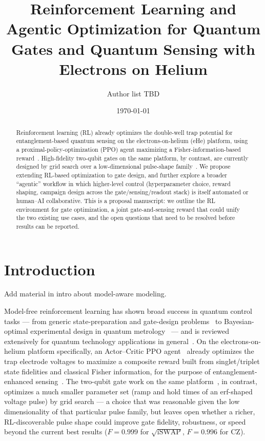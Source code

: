 \documentclass[aps,prapplied,reprint,superscriptaddress,longbibliography]{revtex4-2}
\begin{document}
\title{Reinforcement Learning and Agentic Optimization for Quantum Gates and Quantum Sensing with
Electrons on Helium}

\author{Author list TBD}

\date{\today}

\begin{abstract}
Reinforcement learning (RL) already optimizes the double-well trap potential for entanglement-based
quantum sensing on the electrons-on-helium (eHe) platform, using a proximal-policy-optimization
(PPO) agent maximizing a Fisher-information-based reward~\cite{perruzza2026}. High-fidelity
two-qubit gates on the same platform, by contrast, are currently designed by grid search over a
low-dimensional pulse-shape family~\cite{leinonen2025}. We propose extending RL-based optimization
to gate design, and further explore a broader ``agentic'' workflow in which higher-level control
(hyperparameter choice, reward shaping, campaign design across the gate/sensing/readout stack) is
itself automated or human--AI collaborative. This is a proposal manuscript: we outline the RL
environment for gate optimization, a joint gate-and-sensing reward that could unify the two existing
use cases, and the open questions that need to be resolved before results can be reported.
\end{abstract}

\maketitle

\section{Introduction}

Add material in intro about model-aware modeling.

Model-free reinforcement learning has shown broad success in quantum control tasks — from generic
state-preparation and gate-design problems~\cite{bukov2018reinforcement,niu2019universal} to
Bayesian-optimal experimental design in quantum metrology~\cite{belliardo2024model} — and is
reviewed extensively for quantum technology applications in general~\cite{bukov2026reinforcement}.
On the electrons-on-helium platform specifically, an Actor--Critic PPO
agent~\cite{schulman2017proximal} already optimizes the trap electrode voltages to maximize a
composite reward built from singlet/triplet state fidelities and classical Fisher information,
for the purpose of entanglement-enhanced sensing~\cite{perruzza2026}. The two-qubit gate work on the
same platform~\cite{leinonen2025}, in contrast, optimizes a much smaller parameter set (ramp and
hold times of an erf-shaped voltage pulse) by grid search — a choice that was reasonable given the
low dimensionality of that particular pulse family, but leaves open whether a richer,
RL-discoverable pulse shape could improve gate fidelity, robustness, or speed beyond the current
best results ($F=0.999$ for $\sqrt{\text{iSWAP}}$, $F=0.996$ for CZ).
\end{document}

